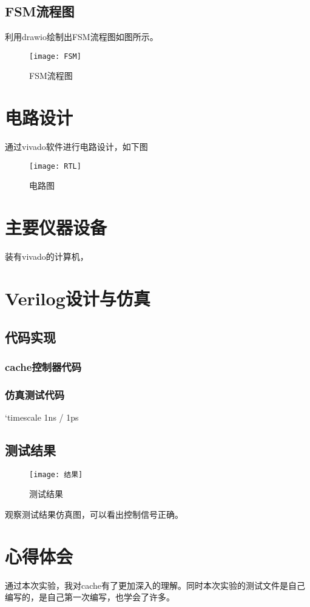 \documentclass{../source/Experiment}
\begin{document}
\subsection{FSM流程图}
利用drawio绘制出FSM流程图如图所示。
\begin{figure}[H]
    \centering
    \texttt{[image: FSM]}
    \caption{FSM流程图}
\end{figure}
\section{电路设计}
通过vivado软件进行电路设计，如下图
\begin{figure}[H]
    \centering
    \texttt{[image: RTL]}
    \caption{电路图}
\end{figure}
\section{主要仪器设备}
装有vivado的计算机，
\section{Verilog设计与仿真}
\subsection{代码实现}
\subsubsection{cache控制器代码}


\subsubsection{仿真测试代码}
`timescale 1ns / 1ps


\subsection{测试结果}
\begin{figure}[H]
    \centering
    \texttt{[image: 结果]}
    \caption{测试结果}
\end{figure}
观察测试结果仿真图，可以看出控制信号正确。

\section{心得体会}
通过本次实验，我对cache有了更加深入的理解。同时本次实验的测试文件是自己编写的，是自己第一次编写，也学会了许多。
\end{document}
